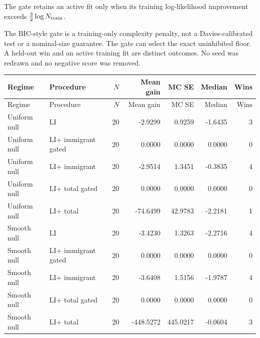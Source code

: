 The gate retains an active fit only when its training log-likelihood improvement exceeds $\tfrac32\log N_{\rm train}$.

The BIC-style gate is a training-only complexity penalty, not a Davies-calibrated test or a nominal-size guarantee. The gate can select the exact uninhibited floor. A held-out win and an active training fit are distinct outcomes. No seed was redrawn and no negative score was removed.

\begingroup\footnotesize\setlength{\tabcolsep}{3pt}

\begin{longtable}{@{}llrrrrr@{}}

\toprule Regime & Procedure & $N$ & Mean gain & MC SE & Median & Wins \\

\midrule\endfirsthead

\toprule Regime & Procedure & $N$ & Mean gain & MC SE & Median & Wins \\

\midrule\endhead

\bottomrule\endlastfoot

Uniform null & LI & 20 & -2.9299 & 0.9259 & -1.6435 & 3 \\

Uniform null & LI+ immigrant gated & 20 & 0.0000 & 0.0000 & 0.0000 & 0 \\

Uniform null & LI+ immigrant & 20 & -2.9514 & 1.3451 & -0.3835 & 4 \\

Uniform null & LI+ total gated & 20 & 0.0000 & 0.0000 & 0.0000 & 0 \\

Uniform null & LI+ total & 20 & -74.6499 & 42.9783 & -2.2181 & 1 \\

Smooth null & LI & 20 & -3.4230 & 1.3263 & -2.2716 & 4 \\

Smooth null & LI+ immigrant gated & 20 & 0.0000 & 0.0000 & 0.0000 & 0 \\

Smooth null & LI+ immigrant & 20 & -3.6408 & 1.5156 & -1.9787 & 4 \\

Smooth null & LI+ total gated & 20 & 0.0000 & 0.0000 & 0.0000 & 0 \\

Smooth null & LI+ total & 20 & -448.5272 & 445.0217 & -0.0604 & 3 \\


\end{longtable}

